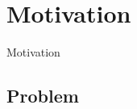 \section{Motivation}
\begin{frame}
	\begin{center}
	\huge{Motivation}
	\end{center}
\end{frame}

\subsection*{Problem}




